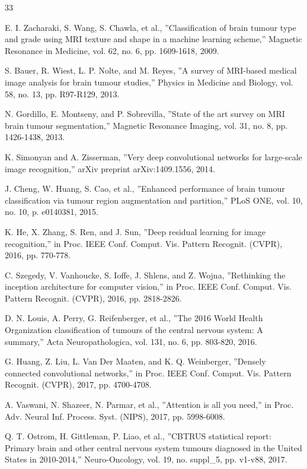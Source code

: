 \documentclass[final,3p,times,number]{elsarticle}
\begin{document}
\begin{thebibliography}{33}

 E. I. Zacharaki, S. Wang, S. Chawla, et al., ''Classification of brain tumour type and grade using MRI texture and shape in a machine learning scheme,'' Magnetic Resonance in Medicine, vol. 62, no. 6, pp. 1609-1618, 2009.

 S. Bauer, R. Wiest, L. P. Nolte, and M. Reyes, ''A survey of MRI-based medical image analysis for brain tumour studies,'' Physics in Medicine and Biology, vol. 58, no. 13, pp. R97-R129, 2013.

 N. Gordillo, E. Montseny, and P. Sobrevilla, ''State of the art survey on MRI brain tumour segmentation,'' Magnetic Resonance Imaging, vol. 31, no. 8, pp. 1426-1438, 2013.

 K. Simonyan and A. Zisserman, ''Very deep convolutional networks for large-scale image recognition,'' arXiv preprint arXiv:1409.1556, 2014.

 J. Cheng, W. Huang, S. Cao, et al., ''Enhanced performance of brain tumour classification via tumour region augmentation and partition,'' PLoS ONE, vol. 10, no. 10, p. e0140381, 2015.

 K. He, X. Zhang, S. Ren, and J. Sun, ''Deep residual learning for image recognition,'' in Proc. IEEE Conf. Comput. Vis. Pattern Recognit. (CVPR), 2016, pp. 770-778.

 C. Szegedy, V. Vanhoucke, S. Ioffe, J. Shlens, and Z. Wojna, ''Rethinking the inception architecture for computer vision,'' in Proc. IEEE Conf. Comput. Vis. Pattern Recognit. (CVPR), 2016, pp. 2818-2826.

 D. N. Louis, A. Perry, G. Reifenberger, et al., ''The 2016 World Health Organization classification of tumours of the central nervous system: A summary,'' Acta Neuropathologica, vol. 131, no. 6, pp. 803-820, 2016.

 G. Huang, Z. Liu, L. Van Der Maaten, and K. Q. Weinberger, ''Densely connected convolutional networks,'' in Proc. IEEE Conf. Comput. Vis. Pattern Recognit. (CVPR), 2017, pp. 4700-4708.

 A. Vaswani, N. Shazeer, N. Parmar, et al., ''Attention is all you need,'' in Proc. Adv. Neural Inf. Process. Syst. (NIPS), 2017, pp. 5998-6008.

 Q. T. Ostrom, H. Gittleman, P. Liao, et al., ''CBTRUS statistical report: Primary brain and other central nervous system tumours diagnosed in the United States in 2010-2014,'' Neuro-Oncology, vol. 19, no. suppl\_5, pp. v1-v88, 2017.


\end{thebibliography}
\end{document}
